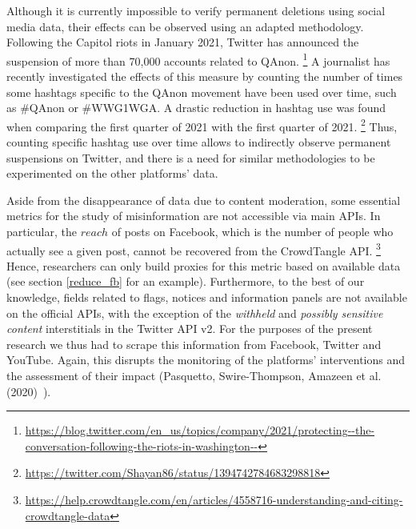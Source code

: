 \documentclass{article}
\begin{document}
Although it is currently impossible to verify permanent deletions using social media data, their effects can be observed using an adapted methodology.
Following the Capitol riots in January 2021, Twitter has announced the suspension of more than 70,000 accounts related to QAnon.
\footnote{\url{https://blog.twitter.com/en_us/topics/company/2021/protecting--the-conversation-following-the-riots-in-washington--}} 
A journalist has recently investigated the effects of this measure by counting the number of times some hashtags specific to the QAnon movement have been used over time, such as \#QAnon or \#WWG1WGA.
A drastic reduction in hashtag use was found when comparing the first quarter of 2021 with the first quarter of 2021.
\footnote{\url{https://twitter.com/Shayan86/status/1394742784683298818}}
Thus, counting specific hashtag use over time allows to indirectly observe permanent suspensions on Twitter, and there is a need for similar methodologies to be experimented on the other platforms' data.

\smallskip 

Aside from the disappearance of data due to content moderation, some essential metrics for the study of misinformation are not accessible via main APIs. 
In particular, the $reach$ of posts on Facebook, which is the number of people who actually see a given post, cannot be recovered from the CrowdTangle API.
\footnote{\url{https://help.crowdtangle.com/en/articles/4558716-understanding-and-citing-crowdtangle-data}} 
Hence, researchers can only build proxies for this metric based on available data (see section \ref{reduce_fb} for an example). 
Furthermore, to the best of our knowledge, fields related to flags, notices and information panels are not available on the official APIs, with the exception of the {\it withheld}  and {\it possibly sensitive content} interstitials in the Twitter API v2. 
For the purposes of the present research we thus had to scrape this information from Facebook, Twitter and YouTube. 
Again, this disrupts the monitoring of the platforms' interventions and the assessment of their impact (Pasquetto, Swire-Thompson, Amazeen et al. (2020)~\cite{pasquetto}).

\smallskip
\end{document}
